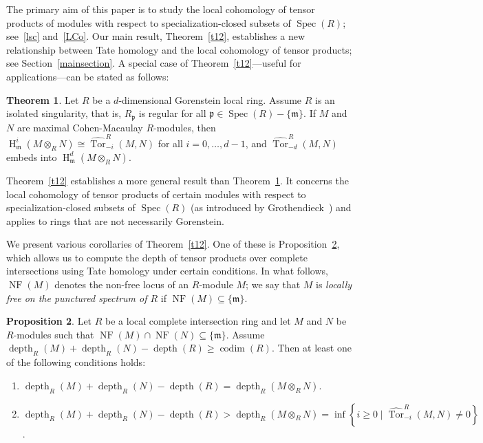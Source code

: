 \documentclass[11pt]{amsart}
\theoremstyle{definition}
\newtheorem{thm}{Theorem}[section]
\newtheorem{prop}[thm]{Proposition}
\theoremstyle{definition}
\numberwithin{equation}{section}
\newcommand{\fm}{\mathfrak{m}}
\newcommand{\fp}{\mathfrak{p}}
\DeclareMathOperator{\depth}{depth}
\DeclareMathOperator{\hh}{H}
\DeclareMathOperator{\Spec}{Spec}
\DeclareMathOperator{\Tor}{Tor}
\DeclareMathOperator{\cod}{codim}
\DeclareMathOperator{\NF}{NF}
\begin{document}
The primary aim of this paper is to study the local cohomology of tensor products of modules with respect to specialization-closed subsets of $\Spec(R)$; see~\ref{lsc} and~\ref{LCo}. Our main result, Theorem~\ref{t12}, establishes a new relationship between Tate homology and the local cohomology of tensor products; see Section~\ref{mainsection}. A special case of Theorem~\ref{t12}---useful for applications---can be stated as follows:

\begin{thm}\label{main-thm-intro} Let $R$ be a $d$-dimensional Gorenstein local ring. Assume $R$ is an isolated singularity, that is, $R_{\fp}$ is regular for all $\fp \in \Spec(R)-\{\fm\}$. If $M$ and $N$ are maximal Cohen-Macaulay $R$-modules, then $\hh^i_{\fm}(M\otimes_RN)\cong\widehat{\Tor}_{-i}^R(M,N)$ for all $i=0, \ldots, d-1$, and $\widehat{\Tor}_{-d}^R(M,N)$ embeds into $\hh^d_{\fm}(M\otimes_RN)$.
\end{thm}

Theorem~\ref{t12} establishes a more general result than Theorem~\ref{main-thm-intro}. It concerns the local cohomology of tensor products of certain modules with respect to specialization-closed subsets of $\Spec(R)$ (as introduced by Grothendieck~\cite{sga2}) and applies to rings that are not necessarily Gorenstein.

We present various corollaries of Theorem~\ref{t12}. One of these is Proposition~\ref{ctc-intro}, which allows us to compute the depth of tensor products over complete intersections using Tate homology under certain conditions. In what follows, $\NF(M)$ denotes the non-free locus of an $R$-module $M$; we say that $M$ is \emph{locally free on the punctured spectrum of $R$} if $\NF(M) \subseteq \{\fm\}$.

\begin{prop} \label{ctc-intro} Let $R$ be a local complete intersection ring and let $M$ and $N$ be $R$-modules such that $\NF(M)\cap\NF(N)\subseteq\{\fm\}$. Assume $\depth_R(M)+\depth_R(N)-\depth(R) \geq  \cod(R)$.
Then at least one of the following conditions holds:
\begin{enumerate}[\rm(i)]
\item $\depth_R(M)+\depth_R(N)-\depth(R)=\depth_R(M\otimes_RN)$. \smallskip
\item $\depth_R(M)+\depth_R(N)-\depth(R)>\depth_R(M\otimes_RN)=\inf \left\{i\geq0\mid\widehat{\Tor}_{-i}^R(M,N)\neq0\right\}$.
\end{enumerate}
\end{prop}
\end{document}
